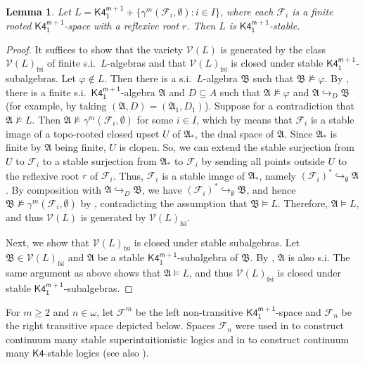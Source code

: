 \documentclass[a4paper,11pt]{article}
\newtheorem{lemma}[theorem]{Lemma}
\theoremstyle{definition}
\theoremstyle{remark}
\numberwithin{theorem}{section}
\newcommand{\alg}[1]{\mathfrak{#1}}
\newcommand{\A}{\alg{A}}
\newcommand{\B}{\alg{B}}
\newcommand{\fr}[1]{\mathcal{#1}}
\newcommand{\F}{\fr{F}}
\newcommand{\class}[1]{\mathcal{#1}}
\newcommand{\V}{\class{V}}
\newcommand{\fsi}{_\mathrm{fsi}}
\newcommand{\logic}[1]{\mathsf{#1}}
\newcommand{\Kf}{\logic{K4}}
\newcommand{\Kff}[2]{\logic{K4^{#1}_{#2}}}
\renewcommand{\phi}{\varphi}
\newcommand{\emp}{\emptyset}
\newcommand{\inj}{\hookrightarrow}
\begin{document}
\begin{lemma} \label{Lem K4m1 stable ref root}
    Let $L = \Kff{m+1}{1} + \{\gamma^m(\F_i, \emp): i \in I\}$, where each $\F_i$ is a finite rooted $\Kff{m+1}{1}$-space with a reflexive root $r$. Then $L$ is $\Kff{m+1}{1}$-stable.
\end{lemma}

\begin{proof} 
    It suffices to show that the variety $\V(L)$ is generated by the class $\V(L)\fsi$ of finite s.i.~$L$-algebras and that $\V(L)\fsi$ is closed under stable $\Kff{m+1}{1}$-subalgebras. Let $\phi \notin L$. Then there is a s.i.~$L$-algebra $\B$ such that $\B \not\models \phi$. By , there is a finite s.i.~$\Kff{m+1}{1}$-algebra $\A$ and $D \subseteq A$ such that $\A \not\models \phi$ and $\A \inj_D \B$ (for example, by taking $(\A, D) = (\A_1, D_1)$). Suppose for a contradiction that $\A \not\models L$. Then $\A \not\models \gamma^m(\F_i, \emp)$ for some $i \in I$, which by  means that $\F_i$ is a stable image of a topo-rooted closed upset $U$ of $\A_*$, the dual space of $\A$. Since $\A_*$ is finite by $\A$ being finite, $U$ is clopen. So, we can extend the stable surjection from $U$ to $\F_i$ to a stable surjection from $\A_*$ to $\F_i$ by sending all points outside $U$ to the reflexive root $r$ of $\F_i$. Thus, $\F_i$ is a stable image of $\A_*$, namely $(\F_i)^* \inj_\emp \A$. By composition with $\A \inj_D \B$, we have $(\F_i)^* \inj_\emp \B$, and hence $\B \not\models \gamma^m(\F_i, \emp)$ by , contradicting the assumption that $\B \models L$. Therefore, $\A \models L$, and thus $\V(L)$ is generated by $\V(L)\fsi$. 
    
    Next, we show that $\V(L)\fsi$ is closed under stable subalgebras. Let $\B \in \V(L)\fsi$ and $\A$ be a stable $\Kff{m+1}{1}$-subalgebra of $\B$. By , $\A$ is also s.i. The same argument as above shows that $\A \models L$, and thus $\V(L)\fsi$ is closed under stable $\Kff{m+1}{1}$-subalgebras.
\end{proof}

For $m \geq 2$ and $n \in \omega$, let $\F^m$ be the left non-transitive $\Kff{m+1}{1}$-space and $\F_n$ be the right transitive space depicted below. Spaces $\F_n$ were used in \cite{LocallyFiniteReducts2017} to construct continuum many stable superintuitionistic logics and in \cite{stablemodallogic} to construct continuum many $\Kf$-stable logics (see also \cite{FiltrationRevisitedLattices2018}).
\end{document}
